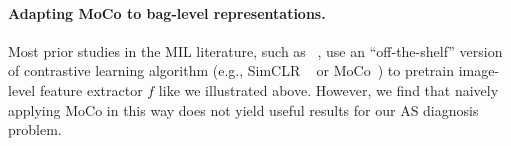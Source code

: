 



\paragraph{Adapting MoCo to bag-level representations.}

Most prior studies in the MIL literature, such as  ~\citet{li2021dual},  use an ``off-the-shelf'' version of contrastive learning algorithm (e.g., SimCLR ~\citep{chen2020simple} or MoCo~\citep{he2020momentum,chen2020improved}) to pretrain image-level feature extractor $f$ like we illustrated above.
However, we find that naively applying MoCo in this way does not yield useful results for our AS diagnosis problem.

